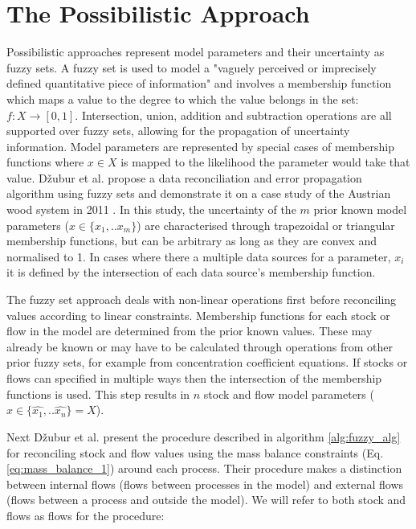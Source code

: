 \documentclass[ %
                    author={Tom Jager},
                supervisor={Dr. Daniel Schien},
                    degree={MEng},
                     title={A Bayesian Inference Engine for Calibrating Uncertainty over UMIS Structured MFA Systems},
                  subtitle={},
                      type={research},
                      year={2019} ]{dissertation}
\begin{document}
\section{The Possibilistic Approach}
Possibilistic approaches represent model parameters and their uncertainty as fuzzy sets. A fuzzy set is used to model a "vaguely perceived or imprecisely defined quantitative piece of information" \cite{dubois2000fuzzy} and involves a membership function which maps a value to the degree to which the value belongs in the set: $f: X \rightarrow{[0,1]}$. Intersection, union, addition and subtraction operations are all supported over fuzzy sets, allowing for the propagation of uncertainty information\cite{viertl2006beschreibung}. Model parameters are represented by special cases of membership functions where $x \in X$ is mapped to the likelihood the parameter would take that value. D\v{z}ubur et al. propose a data reconciliation and error propagation algorithm using fuzzy sets and demonstrate it on a case study of the Austrian wood system in 2011 \cite{dvzubur2017fuzzy}. In this study, the uncertainty of the $m$ prior known model parameters ($x \in \{x_1, .. x_m\}$) are characterised through trapezoidal or triangular membership functions, but can be arbitrary as long as they are convex and normalised to 1. In cases where there a multiple data sources for a parameter, $x_i$ it is defined by the intersection of each data source's membership function.

The fuzzy set approach deals with non-linear operations first before reconciling values according to linear constraints. Membership functions for each stock or flow in the model are determined from the prior known values. These may already be known or may have to be calculated through operations from other prior fuzzy sets, for example from concentration coefficient equations. If stocks or flows can specified in multiple ways then the intersection of the membership functions is used. This step results in $n$ stock and flow model parameters ($\hat{x} \in \{\hat{x_1}, .. \hat{x_n}\} = \hat{X}$).

Next  D\v{z}ubur et al. present the procedure described in algorithm \ref{alg:fuzzy_alg} for reconciling stock and flow values using the mass balance constraints (Eq. \ref{eq:mass_balance_1}) around each process. Their procedure makes a distinction between internal flows (flows between processes in the model) and external flows (flows between a process and outside the model). We will refer to both stock and flows as flows for the procedure:
\end{document}
